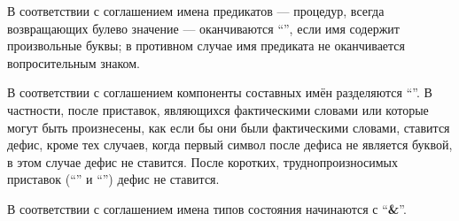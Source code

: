 В соответствии с соглашением имена предикатов --- процедур, всегда возвращающих
булево значение --- оканчиваются ``'', если имя содержит произвольные буквы; в
противном случае имя предиката не оканчивается вопросительным знаком.

В соответствии с соглашением компоненты составных имён разделяются ``\ide{\bfseries -}''. В
частности, после приставок, являющихся фактическими словами или которые могут быть произнесены,
как если бы они были фактическими словами, ставится дефис, кроме тех случаев, когда первый
символ после дефиса не является буквой, в этом случае дефис не ставится. После коротких,
труднопроизносимых приставок (``'' и ``'') дефис не
ставится.

В соответствии с соглашением имена типов состояния начинаются с
``{\bfseries\cf\&}''.

